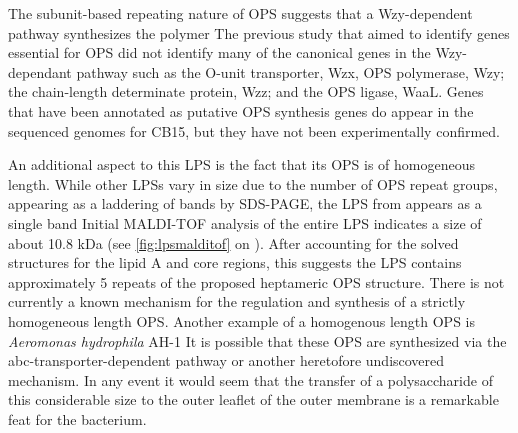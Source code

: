 
The subunit-based repeating nature of \caulobacter{} \ac{OPS} suggests that a Wzy-dependent pathway
synthesizes the polymer The previous study that aimed to identify genes
essential for \ac{OPS} did not identify many of the canonical genes in the Wzy-dependant
pathway such as the O-unit transporter, Wzx, \ac{OPS} polymerase, Wzy; the
chain-length determinate protein, Wzz; and the \ac{OPS} ligase, WaaL. Genes that have been
annotated as putative \ac{OPS} synthesis genes do appear in the sequenced genomes for \caulobacter
CB15, but they have not been experimentally confirmed.

An additional aspect to this \ac{LPS} is the fact that its \ac{OPS} is of homogeneous length. While
other \ac{LPS}s vary in size due to the number of \ac{OPS} repeat groups, appearing as a laddering
of bands by \ac{SDS-PAGE}, the \ac{LPS} from \caulobacter appears as a single
band Initial \ac{MALDI-TOF} analysis of the entire \ac{LPS} indicates a size of
about 10.8 kDa (see \cref{fig:lpsmalditof} on ).  After accounting for the
solved structures for the lipid A and core regions, this suggests the \ac{LPS} contains
approximately 5 repeats of the proposed heptameric \ac{OPS} structure.  There is not currently a
known mechanism for the regulation and synthesis of a strictly homogeneous length \ac{OPS}. Another example of a homogenous length \ac{OPS} is \textit{Aeromonas hydrophila} AH-1
It is possible that these \ac{OPS} are synthesized via the \ac{abc}-transporter-dependent
pathway or another heretofore undiscovered mechanism. In any event it would seem
that the transfer of a polysaccharide of this considerable size to the outer leaflet of the outer
membrane is a remarkable feat for the bacterium.

